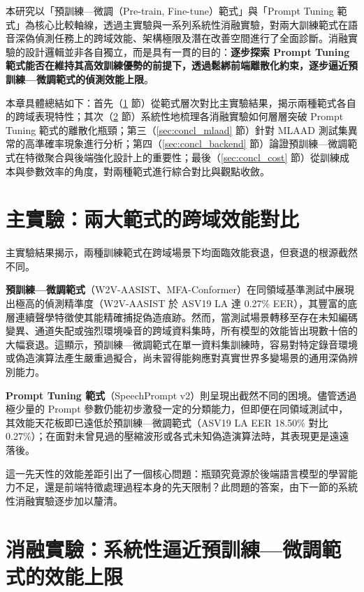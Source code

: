 本研究以「預訓練—微調（Pre-train, Fine-tune）範式」與「Prompt Tuning 範式」為核心比較軸線，透過主實驗與一系列系統性消融實驗，對兩大訓練範式在語音深偽偵測任務上的跨域效能、架構極限及潛在改善空間進行了全面診斷。消融實驗的設計邏輯並非各自獨立，而是具有一貫的目的：\textbf{逐步探索 Prompt Tuning 範式能否在維持其高效訓練優勢的前提下，透過鬆綁前端離散化約束，逐步逼近預訓練—微調範式的偵測效能上限}。

本章具體總結如下：首先（\ref{sec:concl_paradigm_gap} 節）從範式層次對比主實驗結果，揭示兩種範式各自的跨域表現特性；其次（\ref{sec:concl_closing_gap} 節）系統性地梳理各消融實驗如何層層突破 Prompt Tuning 範式的離散化瓶頸；第三（\ref{sec:concl_mlaad} 節）針對 MLAAD 測試集異常的高準確率現象進行分析；第四（\ref{sec:concl_backend} 節）論證預訓練—微調範式在特徵聚合與後端強化設計上的重要性；最後（\ref{sec:concl_cost} 節）從訓練成本與參數效率的角度，對兩種範式進行綜合對比與觀點收斂。

\section{主實驗：兩大範式的跨域效能對比}
\label{sec:concl_paradigm_gap}

主實驗結果揭示，兩種訓練範式在跨域場景下均面臨效能衰退，但衰退的根源截然不同。

\textbf{預訓練—微調範式}（W2V-AASIST、MFA-Conformer）在同領域基準測試中展現出極高的偵測精準度（W2V-AASIST 於 ASV19 LA 達 0.27\% EER），其豐富的底層連續聲學特徵使其能精確捕捉偽造痕跡。然而，當測試場景轉移至存在未知編碼變異、通道失配或強烈環境噪音的跨域資料集時，所有模型的效能皆出現數十倍的大幅衰退。這顯示，預訓練—微調範式在單一資料集訓練時，容易對特定錄音環境或偽造演算法產生嚴重過擬合，尚未習得能夠應對真實世界多變場景的通用深偽辨別能力。

\textbf{Prompt Tuning 範式}（SpeechPrompt v2）則呈現出截然不同的困境。儘管透過極少量的 Prompt 參數仍能初步激發一定的分類能力，但即便在同領域測試中，其效能天花板即已遠低於預訓練—微調範式（ASV19 LA EER 18.50\% 對比 0.27\%）；在面對未曾見過的壓縮波形或各式未知偽造演算法時，其表現更是遠遠落後。

這一先天性的效能差距引出了一個核心問題：瓶頸究竟源於後端語言模型的學習能力不足，還是前端特徵處理過程本身的先天限制？此問題的答案，由下一節的系統性消融實驗逐步加以釐清。

\section{消融實驗：系統性逼近預訓練—微調範式的效能上限}
\label{sec:concl_closing_gap}

